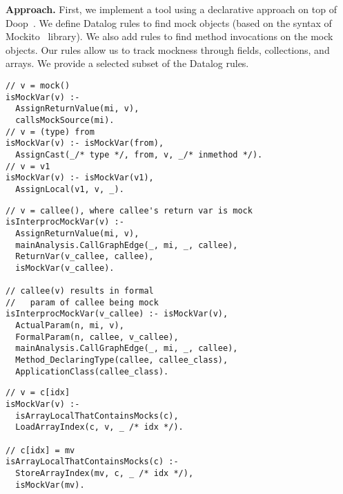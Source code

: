 \documentclass[conference]{IEEEtran}
\begin{document}
\textbf{Approach.}
First, we implement a tool using a declarative approach on top of Doop~\cite{doop}. We define Datalog rules to find mock objects (based on the syntax of Mockito~\cite{mockito} library). We also add rules to find method invocations on the mock objects. Our rules allow us to track mockness through fields, collections, and arrays. We provide a selected subset of the Datalog rules.
\begin{lstlisting}[basicstyle=\ttfamily\small,numbers=none,label={lst:core},caption={Selected rules for Datalog mock analysis},
basicstyle=\scriptsize\ttfamily, framesep=4.5mm, framexleftmargin=1.0mm, captionpos=b, label=lis:datalog-rule, escapechar=!]
// v = mock()
isMockVar(v) :-
  AssignReturnValue(mi, v),
  callsMockSource(mi).
// v = (type) from
isMockVar(v) :- isMockVar(from),
  AssignCast(_/* type */, from, v, _/* inmethod */).
// v = v1
isMockVar(v) :- isMockVar(v1),
  AssignLocal(v1, v, _).
\end{lstlisting}

\begin{lstlisting}[basicstyle=\ttfamily\small,numbers=none,caption={Two rules give interprocedural analysis in Doop.},
basicstyle=\scriptsize\ttfamily, framesep=4.5mm, framexleftmargin=1.0mm, captionpos=b, label=lis:interproc-rule, escapechar=!]
// v = callee(), where callee's return var is mock
isInterprocMockVar(v) :-
  AssignReturnValue(mi, v),
  mainAnalysis.CallGraphEdge(_, mi, _, callee),
  ReturnVar(v_callee, callee),
  isMockVar(v_callee).

// callee(v) results in formal
//   param of callee being mock
isInterprocMockVar(v_callee) :- isMockVar(v),
  ActualParam(n, mi, v),
  FormalParam(n, callee, v_callee),
  mainAnalysis.CallGraphEdge(_, mi, _, callee),
  Method_DeclaringType(callee, callee_class),
  ApplicationClass(callee_class).
\end{lstlisting}

\begin{lstlisting}[basicstyle=\ttfamily\small,numbers=none,caption={Rules for handling arrays.},
basicstyle=\scriptsize\ttfamily, framesep=4.5mm, framexleftmargin=1.0mm, captionpos=b, label=lis:array-rule, escapechar=!]
// v = c[idx]
isMockVar(v) :-
  isArrayLocalThatContainsMocks(c),
  LoadArrayIndex(c, v, _ /* idx */).

// c[idx] = mv
isArrayLocalThatContainsMocks(c) :-
  StoreArrayIndex(mv, c, _ /* idx */),
  isMockVar(mv).
\end{lstlisting}
\end{document}
